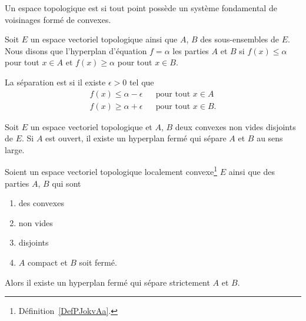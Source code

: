\begin{definition}  \label{DefPJokvAa}
	Un espace topologique est  si tout point possède un système fondamental de voisinages formé de convexes.
\end{definition}

\begin{definition}
	Soit \( E\) un espace vectoriel topologique ainsi que \( A\), \( B\) des sous-ensembles de \( E\). Nous disons que l'hyperplan d'équation \( f=\alpha\)  les parties \( A\) et \( B\) si \( f(x)\leq \alpha\) pour tout \( x\in A\) et \( f(x)\geq \alpha\) pour tout \( x\in B\).

	La séparation est  si il existe \( \epsilon>0\) tel que
	\begin{subequations}
		\begin{align}
			f(x)\leq \alpha-\epsilon &  & \text{pour tout } x\in A  \\
			f(x)\geq \alpha+\epsilon &  & \text{pour tout } x\in B.
		\end{align}
	\end{subequations}
\end{definition}

\begin{theorem}  \label{ThoSAJjdZc}
	Soit \( E\) un espace vectoriel topologique et \( A\), \( B\) deux convexes non vides disjoints de \( E\). Si \( A\) est ouvert, il existe un hyperplan fermé qui sépare \( A\) et \( B\) au sens large.
\end{theorem}

\begin{theorem} \label{ThoACuKgtW}
	Soient un espace vectoriel topologique localement convexe\footnote{Définition~\ref{DefPJokvAa}.} \( E\) ainsi que des parties \( A\), \( B\) qui sont
	\begin{enumerate}
		\item
		      des convexes
		\item
		      non vides
		\item
		      disjoints
		\item
		      \( A\) compact et \( B\) soit fermé.
	\end{enumerate}
	Alors il existe un hyperplan fermé qui sépare strictement \( A\) et \( B\).
\end{theorem}

